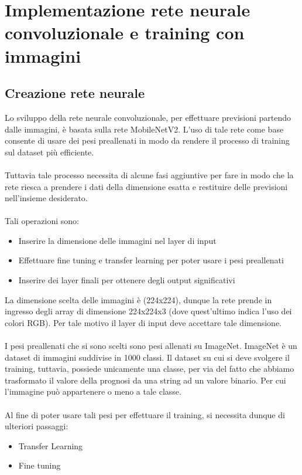 \chapter{Implementazione rete neurale convoluzionale e training con immagini}
\label{ch:CNN}
\section{Creazione rete neurale}
Lo sviluppo della rete neurale convoluzionale, per effettuare previsioni partendo dalle immagini, è basata sulla rete 
MobileNetV2. L'uso di tale rete come base consente di usare dei pesi preallenati in modo da rendere il processo di training sul dataset più efficiente.
\\\\
Tuttavia tale processo necessita di alcune fasi aggiuntive per fare in modo che la rete riesca a prendere i dati della dimensione esatta 
e restituire delle previsioni nell'insieme desiderato.
\\\\
Tali operazioni sono:
\begin{itemize}
    \item Inserire la dimensione delle immagini nel layer di input
    \item Effettuare fine tuning e transfer learning per poter usare i pesi preallenati 
    \item Inserire dei layer finali per ottenere degli output significativi
\end{itemize}

La dimensione scelta delle immagini è (224x224), dunque la rete prende in ingresso degli array di dimensione 224x224x3 (dove quest'ultimo indica l'uso dei colori RGB).
Per tale motivo il layer di input deve accettare tale dimensione.
\\\\
I pesi preallenati che si sono scelti sono pesi allenati su ImageNet. ImageNet è un dataset di immagini suddivise in 1000 classi. Il dataset su cui si deve svolgere il training, tuttavia, possiede 
unicamente una classe, per via del fatto che abbiamo trasformato il valore della prognosi da una string ad un valore binario. 
Per cui l'immagine può appartenere o meno a tale classe.
\\\\
Al fine di poter usare tali pesi per effettuare il training, si necessita dunque di ulteriori passaggi: 
\begin{itemize}
    \item Transfer Learning
    \item Fine tuning
\end{itemize}

